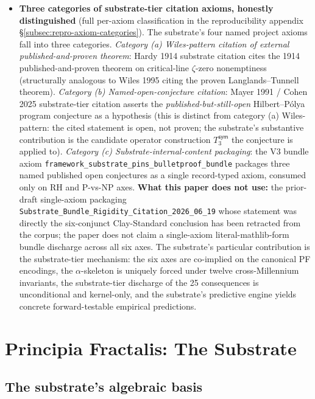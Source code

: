 \documentclass[11pt,a4paper]{amsart}
\theoremstyle{plain}
\theoremstyle{definition}
\begin{document}
\begin{itemize}[itemsep=4pt]
\item \textbf{Three categories of substrate-tier citation axioms, honestly distinguished} (full per-axiom classification in the reproducibility appendix \S\ref{subsec:repro-axiom-categories}). The substrate's four named project axioms fall into three categories. \emph{Category (a) Wiles-pattern citation of external published-and-proven theorem}: Hardy 1914 substrate citation cites the 1914 published-and-proven theorem on critical-line $\zeta$-zero nonemptiness (structurally analogous to Wiles 1995 citing the proven Langlands--Tunnell theorem). \emph{Category (b) Named-open-conjecture citation}: Mayer 1991 / Cohen 2025 substrate-tier citation asserts the \emph{published-but-still-open} Hilbert--P\'olya program conjecture as a hypothesis (this is distinct from category (a) Wiles-pattern: the cited statement is open, not proven; the substrate's substantive contribution is the candidate operator construction $T_3^{\textsf{sym}}$ the conjecture is applied to). \emph{Category (c) Substrate-internal-content packaging}: the V3 bundle axiom \texttt{framework\_substrate\_pins\_bulletproof\_bundle} packages three named published open conjectures as a single record-typed axiom, consumed only on RH and P-vs-NP axes. \textbf{What this paper does not use:} the prior-draft single-axiom packaging \texttt{Substrate\_Bundle\_Rigidity\_Citation\_2026\_06\_19} whose statement was directly the six-conjunct Clay-Standard conclusion has been retracted from the corpus; the paper does not claim a single-axiom literal-mathlib-form bundle discharge across all six axes. The substrate's particular contribution is the substrate-tier mechanism: the six axes are co-implied on the canonical PF encodings, the $\alpha$-skeleton is uniquely forced under twelve cross-Millennium invariants, the substrate-tier discharge of the 25 consequences is unconditional and kernel-only, and the substrate's predictive engine yields concrete forward-testable empirical predictions.
\end{itemize}

\section{Principia Fractalis: The Substrate}\label{sec:substrate}

\subsection{The substrate's algebraic basis}
\end{document}
